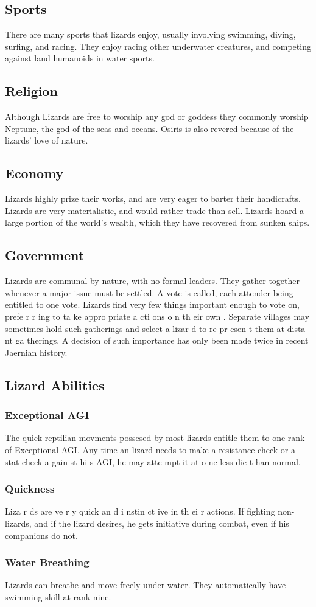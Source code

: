 \begin{multicols*}{2}
\subsection{Sports}
There are many sports that lizards enjoy, usually
involving swimming, diving, surfing, and racing. They enjoy
racing other underwater creatures, and competing against land
humanoids in water sports.
\subsection{Religion}
Although Lizards are free to worship any god or
goddess they commonly worship Neptune, the god of the seas
and oceans. Osiris is also revered because of the lizards’ love
of nature.
\subsection{Economy}
Lizards highly prize their works, and are very eager
to barter their handicrafts. Lizards are very materialistic, and
would rather trade than sell. Lizards hoard a large portion of
the world’s wealth, which they have recovered from sunken
ships.
\subsection{Government}
Lizards are communal by nature, with no formal
leaders. They gather together whenever a major issue must be
settled. A vote is called, each attender being entitled to one
vote. Lizards find very few things important enough to vote
on, prefe r r ing to ta ke appro priate a cti ons o n th eir own .
Separate villages may sometimes hold such gatherings and
select a lizar d to re pr esen t them at dista nt ga therings. A
decision of such importance has only been made twice in
recent Jaernian history.
\subsection{Lizard Abilities}
\subsubsection{Exceptional AGI}
The quick reptilian movments possesed by most
lizards entitle them to one rank of Exceptional AGI. Any
time an lizard needs to make a resistance check or a stat check
a gain st hi s AGI, he may atte mpt it at o ne less die t han
normal.
\subsubsection{Quickness}
Liza r ds are ve r y quick an d i nstin ct ive in th ei r
actions. If fighting non-lizards, and if the lizard desires, he
gets initiative during combat, even if his companions do not.
\subsubsection{Water Breathing}
Lizards can breathe and move freely under water.
They automatically have swimming skill at rank nine.
\end{multicols*}